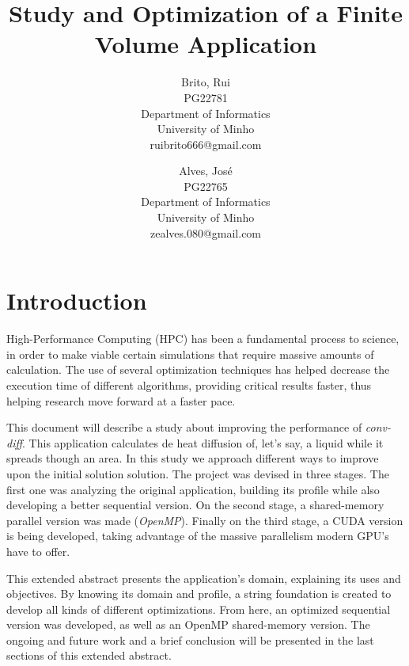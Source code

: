 \documentclass[a4paper,10pt,openright,openbib,twocolumn]{article}
\begin{document}
\begin{multicols}{2}
\title{Study and Optimization of a Finite Volume Application}
\author{
    Brito, Rui\\
    PG22781\\
    Department of Informatics\\
    University of Minho\\
    ruibrito666@gmail.com
  \and
    Alves, José\\
    PG22765\\
    Department of Informatics\\
    University of Minho\\
    zealves.080@gmail.com
}
\date{}
\maketitle
\end{multicols}

\section{Introduction}    %

High-Performance Computing (HPC) has been a fundamental process to science, in order to make viable certain simulations that require massive amounts of calculation. The use of several optimization techniques has helped decrease the execution time of different algorithms, providing critical results faster, thus helping research move forward at a faster pace.

This document will describe a study about improving the performance of \emph{conv-diff}. This application calculates de heat diffusion of, let's say, a liquid while it spreads though an area. In this study we approach different ways to improve upon the initial solution solution. The project was devised in three stages. The first one was analyzing the original application, building its profile while also developing a better sequential version. 
On the second stage, a shared-memory parallel version was made (\emph{OpenMP}). Finally on the third stage, a CUDA version is being developed, taking advantage of the massive parallelism modern GPU's have to offer.

This extended abstract presents the application's domain, explaining its uses and objectives. By knowing its domain and profile, a string foundation is created to develop all kinds of different optimizations. From here, an optimized sequential version was developed, as well as an OpenMP shared-memory version. The ongoing and future work and a brief conclusion will be presented in the last sections of this extended abstract.
\end{document}
